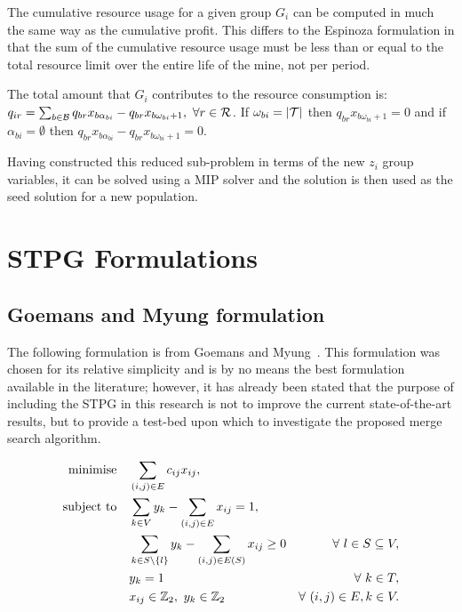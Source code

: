 \documentclass[preprint]{elsarticle}
\begin{document}
The cumulative resource usage for a given group $G_i$ can be computed in much the same way as the cumulative profit. This differs to the Espinoza formulation in that the sum of the cumulative resource usage must be less than or equal to the total resource limit over the entire life of the mine, not per period.
\begin{prop}\label{prop:merge-group-resource}
The total amount that $G_i$ contributes to the resource consumption is: $q_{ir} = \sum_{b \in \S{B}} q_{br}x_{b\alpha_{bi}} - q_{br}x_{b\omega_{bi}+1},\ \forall r \in \S{R}$. If $\omega_{bi} = |\S{T}|$ then $q_{br}x_{b\omega_{bi}+1} = 0$ and if \(\alpha_{bi} = \emptyset\) then \(q_{br}x_{b\alpha_{bi}} - q_{br}x_{b\omega_{bi}+1} = 0\).
\end{prop}
%
Having constructed this reduced sub-problem in terms of the new $z_i$ group variables, it can be solved using a MIP solver and the solution is then used as the seed solution for a new population.

\section{STPG Formulations}\label{app:stpg}
\subsection*{Goemans and Myung formulation}
The following formulation is from Goemans and Myung~\citet{goemans}. This formulation was chosen for its relative simplicity and is by no means the best formulation available in the literature; however, it has already been stated that the purpose of including the STPG in this research is not to improve the current state-of-the-art results, but to provide a test-bed upon which to investigate the proposed merge search algorithm.

{\footnotesize
\begin{align}
\Min \quad & \displaystyle\sum_{(i,j) \in E} c_{ij}x_{ij},\label{eq:stpg_form}\\
\ST \quad & \displaystyle\sum_{k \in V}y_{k} - \displaystyle\sum_{(i,j) \in E}x_{ij} = 1,\nonumber\\
& \displaystyle\sum_{k \in S\setminus \{l\}}y_{k} - \displaystyle\sum_{(i,j) \in E(S)}x_{ij} \geq 0 & \forall\ l \in S \subseteq V,\nonumber\\
& y_k = 1 & \forall\ k \in T,\nonumber\\
& x_{ij} \in \Bin,\ y_k \in \Bin & \forall\ (i,j) \in E, k \in V\nonumber.
\end{align}
}
\end{document}
